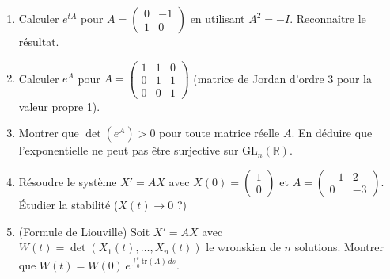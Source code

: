 \vspace{6pt}
\exolabel

\begin{mdframed}[style=exobar]
  \begin{enumerate}
    \item Calculer $e^{tA}$ pour $A = \begin{pmatrix}0&-1\\1&0\end{pmatrix}$
          en utilisant $A^2 = -I$. Reconnaître le résultat.

    \item Calculer $e^A$ pour $A = \begin{pmatrix}1&1&0\\0&1&1\\0&0&1\end{pmatrix}$
          (matrice de Jordan d'ordre 3 pour la valeur propre 1).

    \item Montrer que $\det(e^A) > 0$ pour toute matrice réelle $A$.
          En déduire que l'exponentielle ne peut pas être surjective sur
          $\mathrm{GL}_n(\mathbb{R})$.

    \item Résoudre le système $X' = AX$ avec $X(0)=\begin{pmatrix}1\\0\end{pmatrix}$
          et $A = \begin{pmatrix}-1&2\\0&-3\end{pmatrix}$.
          Étudier la stabilité ($X(t)\to 0$ ?)

    \item (Formule de Liouville) Soit $X' = AX$ avec $W(t) = \det(X_1(t),\ldots,X_n(t))$
          le wronskien de $n$ solutions. Montrer que $W(t) = W(0)\,e^{\int_0^t\mathrm{tr}(A)\,ds}$.
  \end{enumerate}
\end{mdframed}


